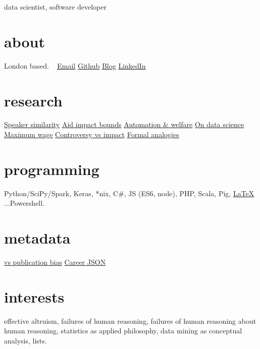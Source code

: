 \documentclass[]{friggeri-cv}
\makeatletter
\newcommand{\email}{\underline{\href{mailto:g@gleech.org}{Email}}}%
\newcommand{\linkedIn}{\underline{\href{https://linkedin.com/in/gleech}{LinkedIn}}}%
\newcommand{\github}{\underline{\href{https://github.com/g-leech}{Github}}}%
\newcommand{\newBlog}{\underline{\href{www.gleech.org}{Blog}}}%
\newcommand{\aidImpact}{\underline{\href{https://www.gleech.org/aid}{Aid impact bounds}}}%
\newcommand{\hmms}{\underline{\href{https://www.gleech.org/accommodation}{Speaker similarity}}}%
\newcommand{\analogies}{\underline{\href{https://www.gleech.org/conversion/}{Formal analogies}}}%
\newcommand{\nonvicious}{\underline{\href{https://www.gleech.org/automatic}{Automation \& welfare}}}%
\newcommand{\latex}{\underline{\href{https://www.gleech.org/cv.tex}{LaTeX}}}%
\newcommand{\livingWage}{\underline{\href{https://www.gleech.org/maximum}{Maximum wage}}}%
\newcommand{\dataScience}{\underline{\href{http://gleech.org/data-science}{On data science}}}%
\newcommand{\controversy}{\underline{\href{http://gleech.org/controversy}{Controversy vs impact}}}%
\newcommand{\odyssey}{\underline{\href{https://docs.google.com/spreadsheets/d/1eAe55oEzFhSFB5qNZYMzjSRLcJOW34_DxdAscXSu0AQ/edit?usp=sharing}{vs publication bias}}}%
\newcommand{\json}{\underline{\href{https://github.com/gavin-leech/MachineCV/blob/master/jobs_4_machines.json}{Career JSON}}}%
\newcommand{\iq}{\underline{\href{https://2.bp.blogspot.com/-T72346JIUhk/WKnGhDfOZTI/AAAAAAAAC2Q/08OJLVovi64flXyfz0RsSZ6mNsjSlvUCACLcB/s1600/2017-02-10-153628.jpg}{IQ: 99th percentile}}}
\makeatother
\begin{document}
%
       {data scientist, software developer} %
%
\begin{aside}
  \section{about}
    London based.
    ~
    \email{}
    \github{}
    \newBlog{}
    \linkedIn{}
  	~
  	~
  \section{research} 
	\hmms{}
  	\aidImpact{}
  	\nonvicious{}
    \dataScience{} 
  	\livingWage{}
    \controversy{}
   	\analogies{}
%
  ~
  ~
  \section{programming}
    Python/SciPy/Spark, Keras, *nix, C\#, JS (ES6, node), PHP, Scala, Pig, \latex{} ...Powershell.
  ~
  ~
  \section{metadata}
    \odyssey{}
	\json{}
\end{aside}

\smallskip
\section{interests}

effective altruism, failures of human reasoning, failures of human reasoning about human reasoning, statistics as applied philosophy, data mining as conceptual analysis, lists.\\
%
\\
\end{document}
